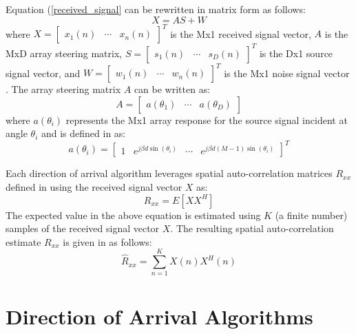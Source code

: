 \documentclass[conference]{IEEEtran}
\begin{document}
	Equation (\ref{received_signal} can be rewritten in matrix form as follows:
	\begin{equation}
		X = AS + W
	\end{equation}
	where $X = \begin{bmatrix} x_1(n) & \cdots & x_n(n)\end{bmatrix}^T$ is the Mx1 received signal vector, $A$ is the MxD array steering matrix, $S = \begin{bmatrix} s_1(n) & \cdots & s_D(n)\end{bmatrix}^T$ is the Dx1 source signal vector, and $W = \begin{bmatrix} w_1(n) & \cdots & w_n(n)\end{bmatrix}^T$ is the Mx1 noise signal vector \cite{doa_algorithms_raghu}. The array steering matrix $A$ can be written as:
	\begin{equation}
		A = \begin{bmatrix} a(\theta_1) & \cdots & a(\theta_D) \end{bmatrix}
	\end{equation}
	where $a(\theta_i)$ represents the Mx1 array response for the source signal incident at angle $\theta_i$ and is defined in \cite{doa_algorithms_raghu} as:
	\begin{equation}
		\label{array_response_vector}
	 	a(\theta_i) = \begin{bmatrix} 1 & e^{j{\beta}d\sin(\theta_i)} & \cdots & e^{j{\beta}d(M-1)\sin(\theta_i)}\end{bmatrix}^T
	\end{equation}
	
		Each direction of arrival algorithm leverages spatial auto-correlation matrices $R_{xx}$ defined in \cite{doa_algorithms_raghu}  using the received signal vector $X$ as:
	\begin{equation}
		R_{xx} = E[XX^H]
	\end{equation}
	The expected value in the above equation is estimated using $K$ (a finite number) samples of the received signal vector $X$. The resulting spatial auto-correlation estimate ${R}_{xx}$ is given in \cite{doa_algorithms_raghu} as follows: 
	\begin{equation}
		\label{spatial_matrix_estimate}
		\hat{R}_{xx} = \sum_{n=1}^{K}{X(n)X^H(n)}
	\end{equation}
	
	\section{Direction of Arrival Algorithms}
	
\end{document}

